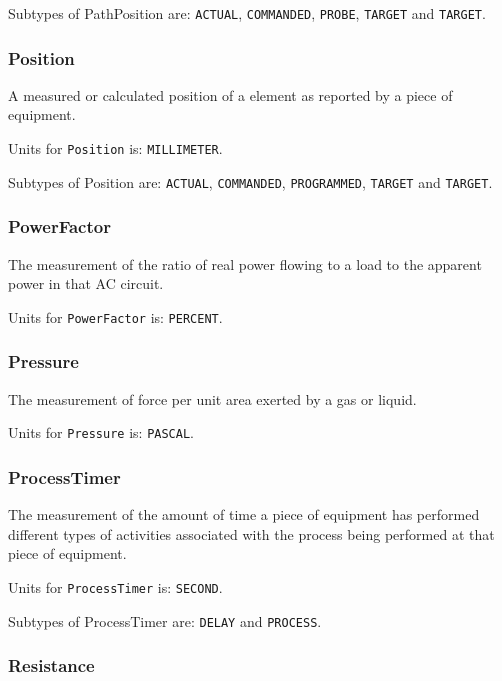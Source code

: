Subtypes of PathPosition are: \texttt{ACTUAL}, \texttt{COMMANDED}, \texttt{PROBE}, \texttt{TARGET} and \texttt{TARGET}. 
\FloatBarrier

\subsubsection{Position}
  \label{sec:Position}


A measured or calculated position of a  element as reported by a piece of equipment.


Units for \texttt{Position} is: \texttt{MILLIMETER}.


Subtypes of Position are: \texttt{ACTUAL}, \texttt{COMMANDED}, \texttt{PROGRAMMED}, \texttt{TARGET} and \texttt{TARGET}. 
\FloatBarrier

\subsubsection{PowerFactor}
  \label{sec:PowerFactor}


The measurement of the ratio of real power flowing to a load to the apparent power in that AC circuit.


Units for \texttt{PowerFactor} is: \texttt{PERCENT}.

\FloatBarrier

\subsubsection{Pressure}
  \label{sec:Pressure}


The measurement of force per unit area exerted by a gas or liquid.


Units for \texttt{Pressure} is: \texttt{PASCAL}.

\FloatBarrier

\subsubsection{ProcessTimer}
  \label{sec:ProcessTimer}


The measurement of the amount of time a piece of equipment has performed different types of activities associated with the process being performed at that piece of equipment.


Units for \texttt{ProcessTimer} is: \texttt{SECOND}.


Subtypes of ProcessTimer are: \texttt{DELAY} and \texttt{PROCESS}. 
\FloatBarrier

\subsubsection{Resistance}
  \label{sec:Resistance}


